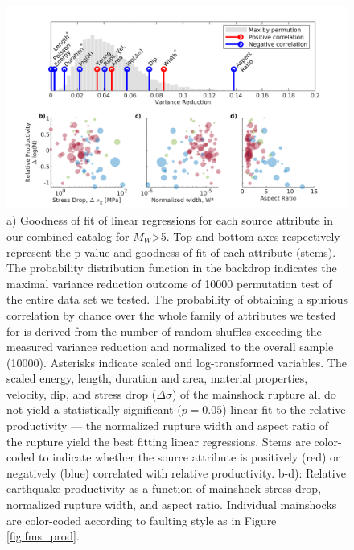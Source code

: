 \documentclass[draft]{agujournal}
\begin{document}
\begin{figure}
\centering
\includegraphics{figures/stem_plot_mw5.png}
\caption{a) Goodness of fit of linear regressions for each source attribute in our combined catalog for $M_W$>5. Top and bottom axes respectively represent the p-value and goodness of fit of each attribute (stems). The probability distribution function in the backdrop indicates the maximal variance reduction outcome of 10000 permutation test of the entire data set we tested. The probability of obtaining a spurious correlation by chance over the whole family of attributes we tested for is derived from the number of random shuffles exceeding the measured variance reduction and normalized to the overall sample (10000). Asterisks indicate scaled and log-transformed variables. The scaled energy, length, duration and area, material properties, velocity, dip, and stress drop ($\Delta\sigma$) of the mainshock rupture all do not yield a statistically significant ($p=0.05$) linear fit to the relative productivity — the normalized rupture width and aspect ratio of the rupture yield the best fitting linear regressions. Stems are color-coded to indicate whether the source attribute is positively (red) or negatively (blue) correlated with relative productivity. b-d): Relative earthquake productivity as a function of mainshock stress drop, normalized rupture width, and aspect ratio. Individual mainshocks are color-coded according to faulting style as in Figure \ref{fig:fms_prod}.}
\label{fig:r2_finite_fault}
\end{figure}
\end{document}
